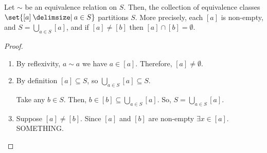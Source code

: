 \documentclass[11pt]{penrose}
\begin{document}
\begin{nthm}
    Let $\sim$ be an equivalence relation on $S$. Then, the collection of equivalence classes $\set{[a] \st a \in S}$ partitions $S$. More precisely, each $[a]$ is non-empty, and $S = \bigcup_{a \in S} [a]$, and if $[a] \neq [b]$ then $[a] \cap [b] = \emptyset$.
\end{nthm}
\begin{proof}
    \phantom{}
    \begin{enumerate}
        \item By reflexivity, $a \sim a$ we have $a \in [a]$. Therefore, $[a] \neq \emptyset$.

        \item By definition $[a] \subseteq S$, so $\bigcup_{a \in S} [a] \subseteq S$.

        Take any $b \in S$. Then, $b \in [b] \subseteq \bigcup_{a \in S} [a]$. So, $S = \bigcup_{a \in S} [a]$.

        \item Suppose $[a] \neq [b]$. Since $[a]$ and $[b]$ are non-empty $\exists x \in [a]$. SOMETHING.
    \end{enumerate}
\end{proof}
\end{document}
